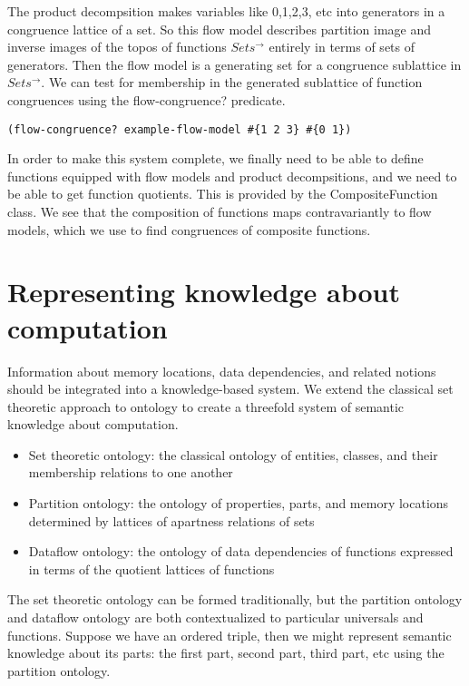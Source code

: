 \documentclass[a4paper,11pt]{report}
\begin{document}
The product decompsition makes variables like 0,1,2,3, etc into generators in a congruence lattice of a set. So this flow model describes partition image and inverse images of the topos of functions $Sets^{\to}$ entirely in terms of sets of generators. Then the flow model is a generating set for a congruence sublattice in $Sets^{\to}$. We can test for membership in the generated sublattice of function congruences using the flow-congruence? predicate.

\lstset {language=Lisp}
\begin{lstlisting}
(flow-congruence? example-flow-model #{1 2 3} #{0 1})
\end{lstlisting}

In order to make this system complete, we finally need to be able to define functions equipped with flow models and product decompsitions, and we need to be able to get function quotients. This is provided by the CompositeFunction class. We see that the composition of functions maps contravariantly to flow models, which we use to find congruences of composite functions.

\newpage 

\section{Representing knowledge about computation}
Information about memory locations, data dependencies, and related notions should be integrated into a knowledge-based system. We extend the classical set theoretic approach to ontology to create a threefold system of semantic knowledge about computation.

\begin{itemize}
\item Set theoretic ontology: the classical ontology of entities, classes, and their membership relations to one another
\item Partition ontology: the ontology of properties, parts, and memory locations determined by lattices of apartness relations of sets
\item Dataflow ontology: the ontology of data dependencies of functions expressed in terms of the quotient lattices of functions
\end{itemize}

The set theoretic ontology can be formed traditionally, but the partition ontology and dataflow ontology are both contextualized to particular universals and functions. Suppose we have an ordered triple, then we might represent semantic knowledge about its parts: the first part, second part, third part, etc using the partition ontology. \\ 
\end{document}
